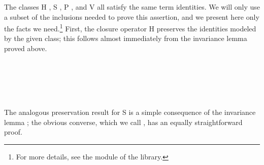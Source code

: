 The classes \af H , \af S , \af P , and \af V  all satisfy the
same term identities.  We will only use a subset of the inclusions needed to prove this
assertion, and we present here only the facts we need.\footnote{For more details, see the
 module of the \agdaalgebras library.}
First, the closure operator \af H preserves the identities modeled by the
given class; this follows almost immediately from the invariance lemma
 proved above.

\begin{AgdaAlign}
\begin{code}%
\>[0]\<%
\\
\>[0]\AgdaSpace{}%
\AgdaModule{\AgdaUnderscore{}}%
\>[10]\AgdaSymbol{\{}\AgdaSpace{}%
\AgdaSymbol{:}\AgdaSpace{}%
\AgdaSpace{}%
\AgdaSymbol{\}\{}\AgdaSpace{}%
\AgdaSymbol{:}\AgdaSpace{}%
\AgdaSymbol{(}\AgdaSpace{}%
\AgdaSpace{}%
\AgdaSymbol{)}\AgdaSpace{}%
\AgdaSymbol{(}\AgdaSpace{}%
\AgdaSpace{}%
\AgdaSpace{}%
\AgdaSpace{}%
\AgdaSpace{}%
\AgdaSymbol{)\}\{}\AgdaSpace{}%
\AgdaSpace{}%
\AgdaSymbol{:}\AgdaSpace{}%
\AgdaSpace{}%
\AgdaSymbol{\}}\AgdaSpace{}%
\<%
\\
\>[0][@{}l@{\AgdaIndent{0}}]%
\>[1]\AgdaSpace{}%
\AgdaSymbol{:}\AgdaSpace{}%
\AgdaSpace{}%
\AgdaSpace{}%
\AgdaSpace{}%
\AgdaSpace{}%
\AgdaSpace{}%
\AgdaSpace{}%
\AgdaSymbol{\{}\AgdaSpace{}%
\AgdaSymbol{=}\AgdaSpace{}%
\AgdaSymbol{\}\{}\AgdaSymbol{\}}\AgdaSpace{}%
\AgdaSpace{}%
\AgdaSpace{}%
\AgdaSpace{}%
\AgdaSpace{}%
\<%
\\
%
\>[1]\AgdaSpace{}%
\AgdaSpace{}%
\AgdaSpace{}%
\AgdaSymbol{(}\AgdaSpace{}%
\AgdaOperator{\AgdaInductiveConstructor{,}}\AgdaSpace{}%
\AgdaSpace{}%
\AgdaOperator{\AgdaInductiveConstructor{,}}\AgdaSpace{}%
\AgdaSymbol{)}\AgdaSpace{}%
\AgdaSymbol{=}\AgdaSpace{}%
\AgdaSymbol{\{}\AgdaSpace{}%
\AgdaSymbol{=}\AgdaSpace{}%
\AgdaSymbol{\}\{}\AgdaSymbol{\}}\AgdaSpace{}%
\AgdaSymbol{(}\AgdaSpace{}%
\AgdaSpace{}%
\AgdaSymbol{)}\AgdaSpace{}%
\<%
\\
\>[0]\<%
\end{code}
The analogous preservation result for \af S is a simple consequence of
the invariance lemma ; the obvious converse, which we call
, has an equally straightforward proof.


\end{AgdaAlign}
